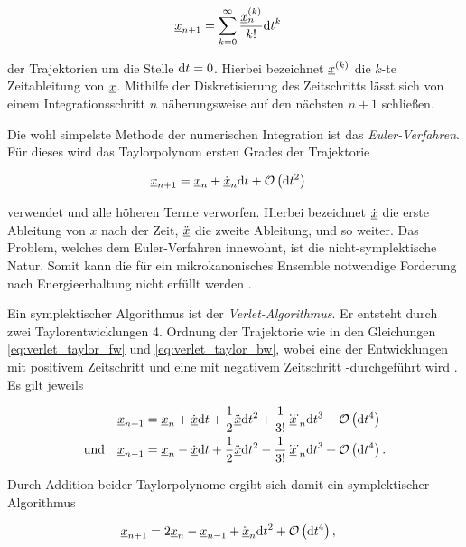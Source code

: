 		\begin{align}
			\underline{x}_{n+1} &= \sum_{k=0}^\infty \frac{\underline{x}^{(k)}_n}{k!} \text{d} t^k
		\end{align}

		der Trajektorien um die Stelle $\text{d} t = 0$. Hierbei bezeichnet $\underline{x}^{(k)}$ die $k$-te
		Zeitableitung von $\underline{x}$. Mithilfe der Diskretisierung des Zeitschritts \dt lässt sich von einem
		Integrationsschritt $n$ näherungsweise auf den nächsten $n+1$ schließen.

		Die wohl simpelste Methode der numerischen Integration ist das \emph{Euler-Verfahren}.
		Für dieses wird das Taylorpolynom ersten Grades der Trajektorie

		\begin{align}
			\underline{x}_{n+1} &= \underline{x}_n + \dot{\underline{x}}_n \text{d} t + \operatorname{\mathcal{O}}\left(\text{d} t^2\right)
		\end{align}

		verwendet und alle höheren Terme verworfen. Hierbei bezeichnet $\dot{\underline{x}}$ die erste
		Ableitung von $x$ nach der Zeit, $\ddot{\underline{x}}$ die zweite Ableitung, und so weiter.
		Das Problem, welches dem Euler-Verfahren innewohnt, ist die nicht-symplektische Natur.
		Somit kann die für ein mikrokanonisches Ensemble notwendige Forderung nach
		Energieerhaltung nicht erfüllt werden \cite{klein2013klassische}.

		Ein symplektischer Algorithmus ist der \emph{Verlet-Algorithmus}. Er entsteht durch zwei
		Taylorentwicklungen 4. Ordnung der Trajektorie wie in den Gleichungen
		\eqref{eq:verlet_taylor_fw} und \eqref{eq:verlet_taylor_bw}, wobei eine der Entwicklungen
		mit positivem Zeitschritt \dt und eine mit negativem Zeitschritt -\dt durchgeführt wird
		\cite{frenkel2001understanding}. Es gilt jeweils

		\begin{align}
			&&\underline{x}_{n+1} &= \underline{x}_n + \dot{\underline{x}}\text{d} t + \frac{1}{2}\ddot{\underline{x}}\text{d} t^2
				+ \frac{1}{3!}\dddot{\underline{x}}_n\text{d} t^3 + \operatorname{\mathcal{O}}\left(\text{d} t^4\right)
				\label{eq:verlet_taylor_fw} \\
			&\text{und}&
			\underline{x}_{n-1} &= \underline{x}_n - \dot{\underline{x}}\text{d} t + \frac{1}{2}\ddot{\underline{x}}\text{d} t^2
				- \frac{1}{3!}\dddot{\underline{x}}_n\text{d} t^3 + \operatorname{\mathcal{O}}\left(\text{d} t^4\right)
				\label{eq:verlet_taylor_bw}
				.
		\end{align}

		Durch Addition beider Taylorpolynome ergibt sich damit ein symplektischer Algorithmus

		\begin{align}
			\underline{x}_{n+1} &= 2 \underline{x}_n - \underline{x}_{n-1} + \ddot{\underline{x}}_n\text{d} t^2
				+ \operatorname{\mathcal{O}}\left(\text{d} t^4\right) \label{eq:verlet},
		\end{align}

